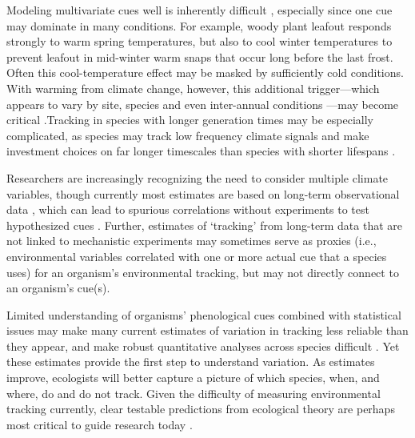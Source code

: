 \documentclass[11pt,letterpaper]{article}
\newcommand{\R}[1]{\label{#1}\linelabel{#1}}
\begin{document}
Modeling multivariate cues well is inherently difficult \citep{chuine2016}, especially since one cue may dominate in many conditions. For example, woody plant leafout responds strongly to warm spring temperatures, but also to cool winter temperatures to prevent leafout in mid-winter warm snaps that occur long before the last frost. Often this cool-temperature effect may be masked by sufficiently cold conditions. With warming from climate change, however, this additional trigger---which appears to vary by site, species and even inter-annual conditions \citep{dennis2003}---may become critical \citep[and potentially lead many phenological models to fail spectacularly in the future as additional cues come into play, see][]{chuine2016}.Tracking in species with longer generation times may be especially complicated, as species may track low frequency climate signals and make investment choices on far longer timescales than species with shorter lifespans \citep{morris2008}. %

Researchers are increasingly recognizing the need to consider multiple climate variables, though currently most estimates are based on long-term observational data \citep[e.g.,][]{chmiel2013,simmonds2019}, which can lead to spurious correlations without experiments to test hypothesized cues \citep{chuinearees}. Further, estimates of `tracking' from long-term data that are not linked to mechanistic experiments may sometimes serve as proxies (i.e., environmental variables correlated with one or more actual cue that a species uses) for an organism's environmental tracking, but may not directly connect to an organism's cue(s). 

Limited understanding of organisms' phenological cues combined with statistical issues may make many current estimates of variation in tracking less reliable than they appear, and make robust quantitative analyses across species difficult \citep{brown2016,kharouba2018}. Yet these estimates provide the first step to understand variation. As estimates improve, ecologists will better capture a picture of which species, when, and where, do and do not track. Given the difficulty of measuring environmental tracking currently, clear testable predictions from ecological theory are perhaps most critical to guide research today \citep{Smaldino2016}. \R{endmeasure} %
\end{document}
